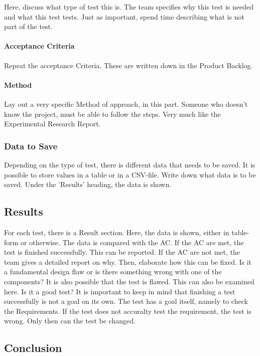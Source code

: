 \documentclass[10pt]{report}
\begin{document}
Here, discuss what type of test this is. The team specifies why this test is needed and what this test tests. Just as important, spend time describing what is not part of the test.

\paragraph{Acceptance Criteria}

Repeat the acceptance Criteria. These are written down in the Product Backlog.

\paragraph{Method}

Lay out a very specific Method of approach, in this part. Someone who doesn't know the project, must be able to follow the steps. Very much like the Experimental Research Report.

\subsubsection{Data to Save}

Depending on the type of test, there is different data that needs to be saved. It is possible to store values in a table or in a CSV-file. Write down what data is to be saved. Under the 'Results' heading, the data is shown.

\subsection{Results}

For each test, there is a Result section. Here, the data is shown, either in table-form or otherwise. The data is compared with the AC. If the AC are met, the test is finished successfully. This can be reported. If the AC are not met, the team gives a detailed report on why. Then, elaborate how this can be fixed. Is it a fundamental design flaw or is there something wrong with one of the components? It is also possible that the test is flawed. This can also be examined here. Is it a good test? It is important to keep in mind that finishing a test successfully is not a goal on its own. The test has a goal itself, namely to check the Requirements. If the test does not accuralty test the requirement, the test is wrong. Only then can the test be changed.

\subsection{Conclusion}
\end{document}
